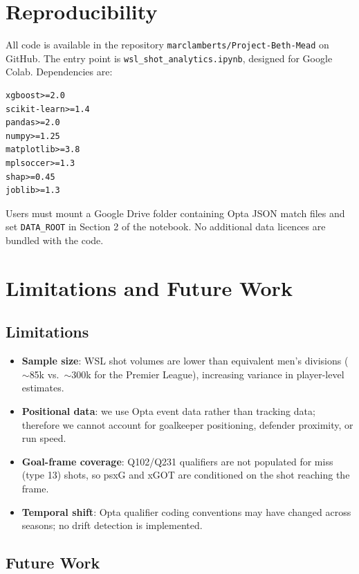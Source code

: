 \documentclass[12pt,a4paper]{article}
\begin{document}
\section{Reproducibility}
\label{sec:repro}

All code is available in the repository \texttt{marclamberts/Project-Beth-Mead} on GitHub. The entry point is \texttt{wsl\_shot\_analytics.ipynb}, designed for Google Colab. Dependencies are:

\begin{lstlisting}
xgboost>=2.0
scikit-learn>=1.4
pandas>=2.0
numpy>=1.25
matplotlib>=3.8
mplsoccer>=1.3
shap>=0.45
joblib>=1.3
\end{lstlisting}

Users must mount a Google Drive folder containing Opta JSON match files and set \texttt{DATA\_ROOT} in Section 2 of the notebook. No additional data licences are bundled with the code.

\section{Limitations and Future Work}
\label{sec:limits}

\subsection{Limitations}

\begin{itemize}
    \item \textbf{Sample size}: WSL shot volumes are lower than equivalent men's divisions ($\sim$85k vs.\ $\sim$300k for the Premier League), increasing variance in player-level estimates.
    \item \textbf{Positional data}: we use Opta event data rather than tracking data; therefore we cannot account for goalkeeper positioning, defender proximity, or run speed.
    \item \textbf{Goal-frame coverage}: Q102/Q231 qualifiers are not populated for miss (type 13) shots, so psxG and xGOT are conditioned on the shot reaching the frame.
    \item \textbf{Temporal shift}: Opta qualifier coding conventions may have changed across seasons; no drift detection is implemented.
\end{itemize}

\subsection{Future Work}
\end{document}
